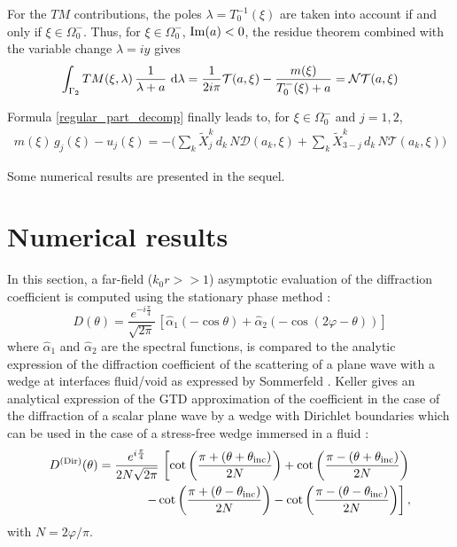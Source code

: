 For the $TM$ contributions, the poles $\lambda = T_0^{-1}(\xi)$ are taken into account if and only if $\xi \in \Omega_0^-$. Thus, for $\xi \in \Omega_0^-$, ${\rm Im}(a) < 0$, the residue theorem combined with the variable change $\lambda = iy$ gives
\begin{equation}
\int_{\Gamma_2} TM(\xi,\lambda) \,  \dfrac{1}{\lambda +a} \, \, {\rm d} \lambda = \frac{1}{2i\pi} \mathcal{T}(a,\xi)- \dfrac{m(\xi)}{T_0^-(\xi) +a}   =  \mathcal{NT}(a,\xi)
\end{equation}

Formula \eqref{regular_part_decomp} finally leads to, for $\xi \in \Omega_0^-$ and $j=1,2$,
\begin{eqnarray}
m(\xi)\, g_j(\xi) -  u_j(\xi)=
-\Big( \sum_k \tilde X_j^{k}\, d_k \, N\mathcal D(a_k,\xi)+\sum_k \tilde X_{3-j}^{k} \, d_k \,
N\mathcal T(a_k,\xi) \Big) \nonumber
\end{eqnarray}

Some numerical results are presented in the sequel.

\section{Numerical results}
\label{Chapter5:results}

In this section, a far-field ($k_0r>>1$) asymptotic evaluation of the diffraction coefficient is computed using the stationary phase method :
\begin{equation}
\label{GTDCoeff_SF}
D(\theta) = \dfrac{e^{-i\frac{\pi}{4}}}{\sqrt{2\pi}} \, [\hat{\alpha}_1( - \cos \theta) + \hat{\alpha}_2( - \cos ( 2\varphi - \theta))]
\end{equation}
where $\hat{\alpha}_1$ and $\hat{\alpha}_2$ are the spectral functions, is compared to the analytic expression of the diffraction coefficient of the scattering of a plane wave with a wedge at interfaces fluid/void as expressed by Sommerfeld \cite{Sommerfeld}. Keller \cite{GTD} gives an analytical expression of the GTD approximation of the coefficient in the case of the diffraction of a scalar plane wave by a wedge with Dirichlet boundaries which can be used in the case of a stress-free wedge immersed in a fluid :
\begin{align}
\label{GTDCoeff_Dir}
D^{\rm (Dir)}(\theta) = \dfrac{e^{i\frac{\pi}{4}}}{2N \sqrt{2\pi}}  \, \left[ \cot \left( \dfrac{\pi + (\theta + \theta_{\rm inc})}{2N} \right) + \cot \left( \dfrac{\pi - (\theta + \theta_{\rm inc})}{2N} \right) \right.   \nonumber \\
\left. - \cot \left( \dfrac{\pi + (\theta - \theta_{\rm inc})}{2N} \right) - \cot \left( \dfrac{\pi - (\theta - \theta_{\rm inc})}{2N} \right) \right],
\end{align}
with $N=2\varphi/\pi$.

